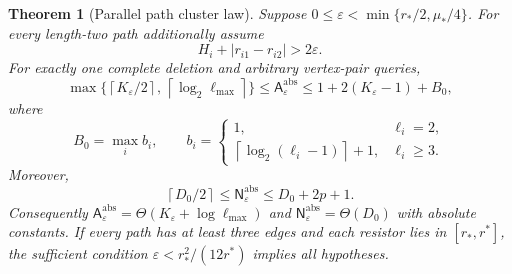 \documentclass[11pt,letterpaper]{article}
\newtheorem{theorem}{Theorem}
\newcommand{\ceil}[1]{\left\lceil #1\right\rceil}
\newcommand{\A}{\mathsf A}
\newcommand{\N}{\mathsf N}
\begin{document}
\begin{theorem}[Parallel path cluster law]\label{thm:parallel}
Suppose $0\le\varepsilon<\min\{r_*/2,\mu_*/4\}$. For every length-two path additionally assume
\[
 H_i+|r_{i1}-r_{i2}|>2\varepsilon.
\]
For exactly one complete deletion and arbitrary vertex-pair queries,
\[
 \max\{\ceil{K_\varepsilon/2},\,\ceil{\log_2\ell_{\max}}\}
 \le\A^{\mathrm{abs}}_\varepsilon
 \le1+2(K_\varepsilon-1)+B_0,
\]
where
\[
 B_0=\max_i b_i,\qquad
 b_i=\begin{cases}
 1,&\ell_i=2,\\
 \ceil{\log_2(\ell_i-1)}+1,&\ell_i\ge3.
 \end{cases}
\]
Moreover,
\[
 \ceil{D_0/2}\le\N^{\mathrm{abs}}_\varepsilon\le D_0+2p+1.
\]
Consequently $\A^{\mathrm{abs}}_\varepsilon=\Theta(K_\varepsilon+\log\ell_{\max})$ and $\N^{\mathrm{abs}}_\varepsilon=\Theta(D_0)$ with absolute constants. If every path has at least three edges and each resistor lies in $[r_*,r^*]$, the sufficient condition $\varepsilon<r_*^2/(12r^*)$ implies all hypotheses.
\end{theorem}
\end{document}
